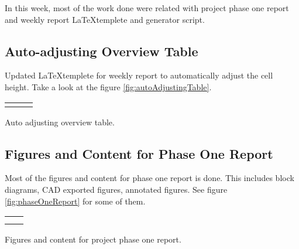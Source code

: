 \documentclass[../weekly]{subfiles}
\begin{document}

In this week, most of the work done were related with project phase one report and weekly
report \LaTeX templete and generator script.

\subsection{Auto-adjusting Overview Table}

Updated \LaTeX templete for weekly report to automatically adjust the cell height. Take
a look at the figure \ref{fig:autoAdjustingTable}.

\begin{center}
    \begin{tabular} {
            ccc
        }

        \includegraphics [
            width = 0.30\textwidth,
        ] {wr1.pdf}


        &
        \includegraphics [
            width = 0.30\textwidth,
        ] {wr3.pdf}

        &
        \includegraphics [
            width = 0.30\textwidth,
        ] {wr4.pdf}

        \\

    \end{tabular}
     {Auto adjusting overview table.}
    \label{fig:autoAdjustingTable}
\end{center}

\subsection{Figures and Content for Phase One Report}

Most of the figures and content for phase one report is done. This
includes block diagrams, CAD exported figures, annotated figures.
See figure \ref{fig:phaseOneReport} for some of them.

\begin{center}
    \begin{tabular} {
            cc
        }

        \includegraphics [
            width = 0.45\textwidth,
        ] {ss1.png}

        &
        \includegraphics [
            width = 0.45\textwidth,
        ] {ss2.png}

        \\
        \includegraphics [
            width = 0.45\textwidth,
        ] {ss3.png}

        &
        \includegraphics [
            width = 0.45\textwidth,
        ] {ss4.png}

        \\

    \end{tabular}
     {Figures and content for project phase one report.}
    \label{fig:phaseOneReport}
\end{center}
\end{document}
